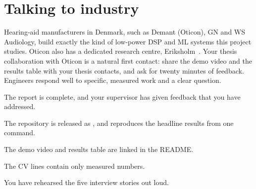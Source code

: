 \section{Talking to industry}\label{sec:writeup:industry}

Hearing-aid manufacturers in Denmark, such as Demant (Oticon), GN and WS
Audiology, build exactly the kind of low-power DSP and ML systems this project
studies. Oticon also has a dedicated research centre,
Eriksholm~\cite{ch12-13:eriksholm}. Your thesis collaboration with Oticon is a
natural first contact: share the demo video and the results table with your
thesis contacts, and ask for twenty minutes of feedback. Engineers respond well
to specific, measured work and a clear question.

\begin{donebox}
\begin{checklist}
  \item The report is complete, and your supervisor has given feedback that you have addressed.
  \item The repository is released as , and reproduces the headline results from one command.
  \item The demo video and results table are linked in the README.
  \item The CV lines contain only measured numbers.
  \item You have rehearsed the five interview stories out loud.
\end{checklist}
\end{donebox}
